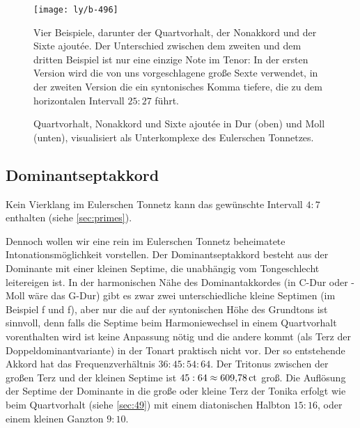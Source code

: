 \begin{figure}
  \centering
  \texttt{[image: ly/b-496]}
  \caption{Vier Beispiele, darunter der Quartvorhalt, der Nonakkord und der
  	Sixte ajoutée. Der Unterschied zwischen dem zweiten und dem dritten Beispiel
  	ist nur eine einzige Note im Tenor: In der ersten Version wird die von uns
  	vorgeschlagene große Sexte verwendet, in der zweiten Version die ein
  	syntonisches Komma tiefere, die zu dem horizontalen Intervall $25:27$
  	führt.}\label{fig:496}
\end{figure}

\begin{figure}
  \centering
  
  \caption{Quartvorhalt, Nonakkord und Sixte ajoutée in Dur
    (oben) und Moll (unten), visualisiert als Unterkomplexe des Eulerschen
    Tonnetzes.}\label{fig:chordLines}
\end{figure}

\subsection{Dominantseptakkord}
\label{sec:dom7syn}

Kein Vierklang im Eulerschen Tonnetz kann das gewünschte Intervall $4:7$
enthalten (siehe \cref{sec:primes}).

Dennoch wollen wir eine rein im Eulerschen Tonnetz beheimatete
Intonationsmöglichkeit vorstellen. Der Dominantseptakkord besteht aus der
Dominante mit einer kleinen Septime, die unabhängig vom Tongeschlecht
leitereigen ist. In der harmonischen Nähe des Dominantakkordes (in C-Dur oder
-Moll wäre das G-Dur) gibt es zwar zwei unterschiedliche kleine Septimen (im
Beispiel \natural f und \naturalp f), aber nur die auf der syntonischen Höhe
des Grundtons ist sinnvoll, denn falls die Septime beim Harmoniewechsel in
einem Quartvorhalt vorenthalten wird ist keine Anpassung nötig und die andere
kommt (als Terz der Doppeldominantvariante) in der Tonart praktisch nicht vor.
Der so entstehende Akkord hat das Frequenzverhältnis $36:45:54:64$. Der Tritonus
zwischen der großen Terz und der kleinen Septime ist
$45:64\approx 609{,}78\,\mathrm{ct}$ groß. Die Auflösung der Septime der Dominante
in die große oder kleine Terz der Tonika erfolgt wie beim Quartvorhalt (siehe
\cref{sec:49}) mit einem diatonischen Halbton $15:16$, oder einem kleinen
Ganzton $9:10$.

